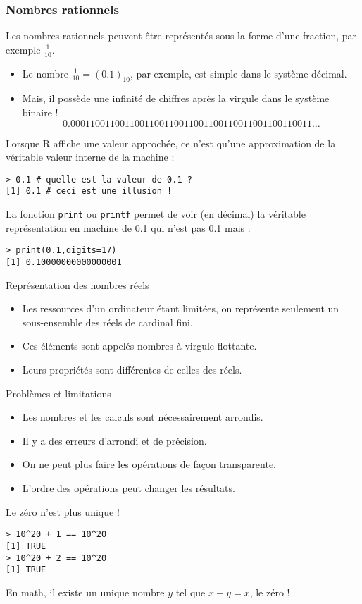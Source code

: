 \documentclass[10pt]{beamer}
\begin{document}
\begin{frame}[fragile]
  \frametitle{Nombres rationnels}
  Les nombres rationnels peuvent être représentés sous la forme d'une fraction, par exemple $\frac{1}{10}$.
  \begin{itemize}
  \item Le nombre $\frac{1}{10} = (0.1)_{10}$, par exemple, est simple dans le système décimal.
  \item Mais, il possède une infinité de chiffres après la virgule dans le système binaire !
    \[0.0001100110011001100110011001100110011001100110011\ldots\]
  \end{itemize}
  Lorsque R affiche une valeur approchée, ce n'est qu'une approximation de la véritable valeur interne de la machine :
  \begin{lstlisting}
> 0.1 # quelle est la valeur de 0.1 ?
[1] 0.1 # ceci est une illusion !
\end{lstlisting}

La fonction \texttt{print} ou \texttt{printf} permet de voir (en décimal) la véritable représentation en machine de 0.1 qui n'est pas 0.1 mais :
\begin{lstlisting}
> print(0.1,digits=17)
[1] 0.10000000000000001
\end{lstlisting}
\end{frame}

\begin{frame}[fragile]{Représentation des nombres réels}
  \begin{itemize}
  \item Les ressources d'un ordinateur étant limitées, on représente seulement un \alert{sous-ensemble des réels de cardinal fini}.
  \item Ces éléments sont appelés \alert{nombres à virgule flottante}.
  \item<alert@1> Leurs propriétés sont différentes de celles des réels.
  \end{itemize}

  \begin{alertblock}{Problèmes et limitations}
    \begin{itemize}
    \item Les nombres et les calculs sont nécessairement arrondis.
    \item Il y a des erreurs d’arrondi et de précision.
    \item On ne peut plus faire les opérations de façon transparente.
    \item L'ordre des opérations peut changer les résultats.
  \end{itemize}
\end{alertblock}


\begin{exampleblock}{Le zéro n'est plus unique !}
\begin{lstlisting}[style=block]
> 10^20 + 1 == 10^20
[1] TRUE
> 10^20 + 2 == 10^20
[1] TRUE
\end{lstlisting}
En math, il existe un unique nombre $y$ tel que $x + y = x$, le zéro !
\end{exampleblock}
\end{frame}
\end{document}
